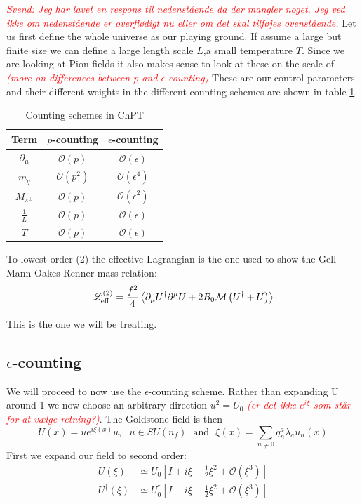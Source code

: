 \documentclass[a4,10pt,titlepage]{article}
\renewcommand\[{\begin{equation*}}
\renewcommand\]{\end{equation*}}
\newcommand{\be}{\begin{equation}}
\newcommand{\ee}{\end{equation}}
\newcommand{\BigO}{\mathcal{O}}
\numberwithin{equation}{section}
\newcommand{\lp}{\left}
\newcommand{\rp}{\right}
\newcommand{\edit}[1]{\textcolor{red}{\textit{#1}}}
\newcommand{\Lar}{\mathscr{L}}
\begin{document}
\edit{Svend: Jeg har lavet en respons til nedenstående da der mangler noget. Jeg ved ikke om nedenstående er overflødigt nu eller om det skal tilføjes ovenstående.}
Let us first define the whole universe as our playing ground. If assume a large but finite size we can define a large length scale $L$,a small temperature $T$. Since we are looking at Pion fields it also makes sense to look at these on the scale of \edit{(more on differences between p and $\epsilon$ counting)} These are our control parameters and their different weights in the different counting schemes are shown in table \ref{tab:my_label1}.
\begin{table}[htb]
    \centering
    \begin{tabular}{c|c|c}
        Term & $p$-counting & $\epsilon$-counting\\
        \hline\hline
        $\partial_\mu$ & $\BigO(p)$  & $\BigO(\epsilon)$\\
        \hline
        $m_q$ & $\BigO(p^2)$ & $\BigO(\epsilon^4)$\\
        \hline
        $M_{\pi^\pm}$ & $\BigO(p)$ & $\BigO(\epsilon^2)$ \\
        \hline
        $\frac{1}{L}$ & $\BigO(p)$ & $\BigO(\epsilon)$ \\
        \hline
        $T$ & $\BigO(p)$ & $\BigO(\epsilon)$ 
    \end{tabular}
    \caption{Counting schemes in ChPT}
    \label{tab:my_label1}
\end{table}

To lowest order (2) the effective Lagrangian is the one used to show the Gell-Mann-Oakes-Renner mass relation:
\[
\Lar_{\text{eff}}^{(2)}=\frac{f^2}{4}\expval{\partial_\mu U^\dagger \partial^\mu U +2B_0\mathcal{M}\lp( U^\dagger+U \rp)}
\]

This is the one we will be treating.
\subsection{$\epsilon$-counting}
We will proceed to now use the $\epsilon$-counting scheme. Rather than expanding U around 1 we now choose an arbitrary direction $u^2=U_0$ \edit{(er det ikke $e^{i\xi}$ som står for at vælge retning?)}. The Goldstone field is then
\be
U(x)=ue^{i\xi(x)}u,\:\:\:u\in SU(n_f)\:\:\:\text{and}\:\:\:\xi(x)=\sum_{n\neq 0}q_n^a\lambda_au_n(x)
\ee
First we expand our field to second order:
\begin{align*}
U(\xi)&\simeq U_0\lp[ I+i\xi-\frac{1}{2}\xi^2+\mathcal{O}(\xi^3)\rp]\\
U^\dagger(\xi)&\simeq U_0^\dagger\lp[ I-i\xi-\frac{1}{2}\xi^2+\mathcal{O}(\xi^3)\rp]
\end{align*}
\end{document}
